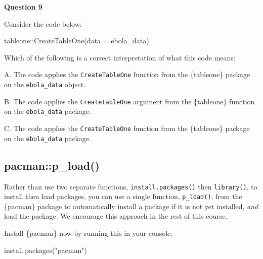 \documentclass[
  letterpaper,
  DIV=11,
  numbers=noendperiod]{scrreprt}
\newenvironment{Shaded}{\begin{snugshade}}{\end{snugshade}}
\newcommand{\AttributeTok}[1]{\textcolor[rgb]{0.40,0.45,0.13}{#1}}
\newcommand{\FunctionTok}[1]{\textcolor[rgb]{0.28,0.35,0.67}{#1}}
\newcommand{\NormalTok}[1]{\textcolor[rgb]{0.00,0.23,0.31}{#1}}
\newcommand{\SpecialCharTok}[1]{\textcolor[rgb]{0.37,0.37,0.37}{#1}}
\newcommand{\StringTok}[1]{\textcolor[rgb]{0.13,0.47,0.30}{#1}}
\begin{document}
\begin{tcolorbox}[enhanced jigsaw, title=\textcolor{quarto-callout-tip-color}{\faLightbulb}\hspace{0.5em}{Practice}, colbacktitle=quarto-callout-tip-color!10!white, leftrule=.75mm, arc=.35mm, opacityback=0, bottomrule=.15mm, rightrule=.15mm, toptitle=1mm, breakable, toprule=.15mm, colback=white, coltitle=black, colframe=quarto-callout-tip-color-frame, bottomtitle=1mm, titlerule=0mm, left=2mm, opacitybacktitle=0.6]

\textbf{Question 9}

Consider the code below:

\begin{Shaded}
\begin{Highlighting}[]
\NormalTok{tableone}\SpecialCharTok{::}\FunctionTok{CreateTableOne}\NormalTok{(}\AttributeTok{data =}\NormalTok{ ebola\_data)}
\end{Highlighting}
\end{Shaded}

Which of the following is a correct interpretation of what this code
means:

A. The code applies the \texttt{CreateTableOne} function from the
\{tableone\} package on the \texttt{ebola\_data} object.

B. The code applies the \texttt{CreateTableOne} argument from the
\{tableone\} function on the \texttt{ebola\_data} package.

C. The code applies the \texttt{CreateTableOne} function from the
\{tableone\} package on the \texttt{ebola\_data} package.

\end{tcolorbox}

\subsection{pacman::p\_load()}\label{pacmanp_load}

Rather than use two separate functions, \texttt{install.packages()} then
\texttt{library()}, to install then load packages, you can use a single
function, \texttt{p\_load()}, from the \{pacman\} package to
automatically install a package if it is not yet installed, \emph{and}
load the package. We encourage this approach in the rest of this course.

Install \{pacman\} now by running this in your console:

\begin{Shaded}
\begin{Highlighting}[]
\FunctionTok{install.packages}\NormalTok{(}\StringTok{"pacman"}\NormalTok{)}
\end{Highlighting}
\end{Shaded}
\end{document}
